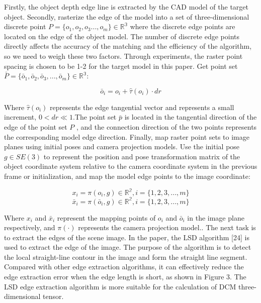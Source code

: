 \documentclass{cta-author}
\begin{document}
Firstly, the object depth edge line is extracted by the CAD model of the target object. Secondly, rasterize the edge of the model into a set of three-dimensional discrete point $P={\{o_{1},o_{2},o_{3}...,o_{m}\}}\in \mathbb{R^{3}}$ where the discrete edge points are located on the edge of the object model. The number of discrete edge points directly affects the accuracy of the matching and the efficiency of the algorithm, so we need to weigh these two factors. Through experiments, the raster point spacing is chosen to be 1-2  for the target model in this paper. Get point set $\bar{P}={\{\bar{o}_{1},\bar{o}_{2},\bar{o}_{3},...,\bar{o}_{m}\}}\in \mathbb{R^{3}}$:

\begin{equation}\label{eq3} 
   \bar{o}_i=o_i+\hat{\tau}(o_i)\cdot dr
\end{equation}

Where $\hat{\tau}(o_i)$ represents the edge tangential vector and  represents a small increment, $0<dr\ll 1$.The point set $\bar{p}$ is located in the tangential direction of the edge of the point set $P$ , and the connection direction of the two points represents the corresponding model edge direction. Finally, map raster point sets to image planes using initial poses and camera projection models. Use the initial pose $g\in SE(3)$ to represent the position and pose transformation matrix of the object coordinate system relative to the camera coordinate system in the previous frame or initialization, and map the model edge points to the image coordinate: 

\begin{equation}\label{eq4}
  x_{i}=\pi(o_{i},g)\in \mathbb{R^{2}}, i=\{1,2,3,...,m\}
\end{equation}
\begin{equation}\label{eq5}
\bar{x}_{i}=\pi(\bar{o}_{i},g)\in \mathbb{R^{2}}, i=\{1,2,3,...,m\}
\end{equation}

Where $x_i$ and $\bar{x}_i$  represent the mapping points of $o_i$ and $\bar{o}_i$ in the image plane respectively, and $\pi(\cdot)$ represents the camera projection model.. The next task is to extract the edges of the scene image. In the paper, the LSD algorithm [24] is used to extract the edge of the image. The purpose of the algorithm is to detect the local straight-line contour in the image and form the straight line segment. Compared with other edge extraction algorithms, it can effectively reduce the edge extraction error when the edge length is short, as shown in Figure 3. The LSD edge extraction algorithm is more suitable for the calculation of DCM three-dimensional tensor.
\end{document}
